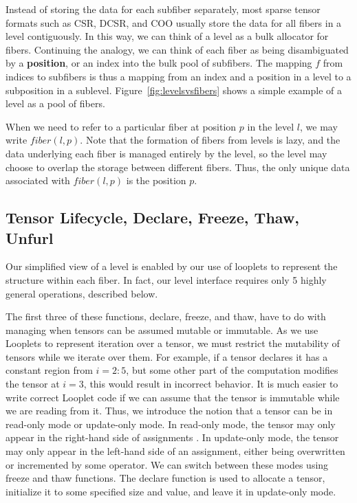 Instead of storing the data for each subfiber separately, most sparse tensor
formats such as CSR, DCSR, and COO usually store the data for all fibers in a
level contiguously. In this way, we can think of a level as a bulk allocator for
fibers. Continuing the analogy, we can think of each fiber as being
disambiguated by a \textbf{position}, or an index into the bulk pool of
subfibers. The mapping $f$ from indices to subfibers is thus a mapping from an
index and a position in a level to a subposition in a sublevel.
Figure~\ref{fig:levelsvsfibers} shows a simple example of a level as a pool of fibers.

When we need to refer to a particular fiber at position $p$ in the level $l$, we
may write $fiber(l, p)$. Note that the formation of fibers from levels is lazy,
and the data underlying each fiber is managed entirely by the level, so the
level may choose to overlap the storage between different fibers. Thus, the only
unique data associated with $fiber(l, p)$ is the position $p$.

\subsection{Tensor Lifecycle, Declare, Freeze, Thaw, Unfurl}

Our simplified view of a level is enabled by our use of looplets to represent
the structure within each fiber.
%
In fact, our level interface requires only 5
highly general operations, described below.

The first three of these functions, declare, freeze, and thaw, have to do with
managing when tensors can be assumed mutable or immutable.
%
%
As we use Looplets to
represent iteration over a tensor, we must restrict the mutability of tensors
while we iterate over them. 
%
For example, if a tensor declares it has a constant
region from $i = 2:5$, but some other part of the computation modifies the
tensor at $i = 3$, this would result in incorrect behavior.
%
It is much easier to
write correct Looplet code if we can assume that the tensor is immutable while
we are reading from it.
%
Thus, we introduce the notion that a tensor can be in
read-only mode or update-only mode.  
%
In read-only mode, the tensor may only
appear in the right-hand side of assignments
%
. In update-only mode, the tensor
may only appear in the left-hand side of an assignment, either being overwritten
or incremented by some operator. 
%
We can switch between these modes using freeze
and thaw functions.
%
The declare function is used to allocate a tensor,
initialize it to some specified size and value, and leave it in update-only
mode. 

